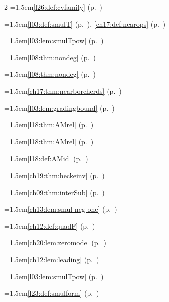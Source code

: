 \begin{multicols}{2}
\hangindent=1.5em\quad \ref{l26:def:cvfamily} (p.~\pageref{l26:def:cvfamily})\par
\hangindent=1.5em\quad \ref{l03:def:smulT} (p.~\pageref{l03:def:smulT}), \ref{ch17:def:nearops} (p.~\pageref{ch17:def:nearops})\par
\hangindent=1.5em\quad \ref{l03:lem:smulTpow} (p.~\pageref{l03:lem:smulTpow})\par
\hangindent=1.5em\quad \ref{l08:thm:nondeg} (p.~\pageref{l08:thm:nondeg})\par
\hangindent=1.5em\quad \ref{l08:thm:nondeg} (p.~\pageref{l08:thm:nondeg})\par
\hangindent=1.5em\quad \ref{ch17:thm:nearborcherds} (p.~\pageref{ch17:thm:nearborcherds})\par
\hangindent=1.5em\quad \ref{l03:lem:gradingbound} (p.~\pageref{l03:lem:gradingbound})\par
\hangindent=1.5em\quad \ref{l18:thm:AMrel} (p.~\pageref{l18:thm:AMrel})\par
\hangindent=1.5em\quad \ref{l18:thm:AMrel} (p.~\pageref{l18:thm:AMrel})\par
\hangindent=1.5em\quad \ref{l18:def:AMid} (p.~\pageref{l18:def:AMid})\par
\hangindent=1.5em\quad \ref{ch19:thm:heckeinv} (p.~\pageref{ch19:thm:heckeinv})\par
\hangindent=1.5em\quad \ref{ch09:thm:interSub} (p.~\pageref{ch09:thm:interSub})\par
\hangindent=1.5em\quad \ref{ch13:lem:smul-neg-one} (p.~\pageref{ch13:lem:smul-neg-one})\par
\hangindent=1.5em\quad \ref{ch12:def:quadF} (p.~\pageref{ch12:def:quadF})\par
\hangindent=1.5em\quad \ref{ch20:lem:zeromode} (p.~\pageref{ch20:lem:zeromode})\par
\hangindent=1.5em\quad \ref{ch12:lem:leading} (p.~\pageref{ch12:lem:leading})\par
\hangindent=1.5em\quad \ref{l03:lem:smulTpow} (p.~\pageref{l03:lem:smulTpow})\par
\hangindent=1.5em\quad \ref{l23:def:smulform} (p.~\pageref{l23:def:smulform})\par

\end{multicols}
